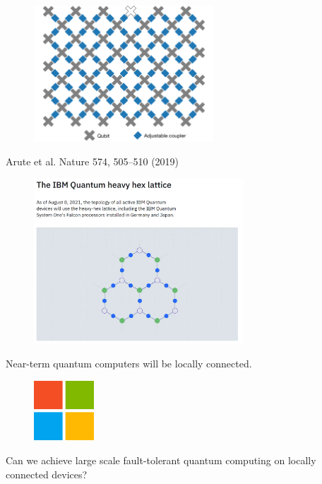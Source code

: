 \begin{frame}
  \titlepage
\end{frame}

\begin{frame}
  \centering
  \begin{figure}
    \includegraphics[width=0.6\textwidth]{figs/sycamore_precessor.png}
  \end{figure}
  {\small \color{spingrey} Arute et al. Nature 574, 505–510 (2019)}
\end{frame}

\begin{frame}
  \centering
  \begin{figure}
    \includegraphics[width=0.7\textwidth]{figs/ibm_lattice.png}
  \end{figure}
\end{frame}

\begin{frame}
  \centering
  \Huge 
  \color{spinprimary}
  Near-term quantum computers will be locally connected.
\end{frame}

\begin{frame}
  \centering
  \begin{figure}
    \includegraphics[width=0.2\textwidth]{figs/microsoft.png}
  \end{figure}
  \LARGE
  Can we achieve large scale fault-tolerant quantum computing on locally connected devices?
\end{frame}

